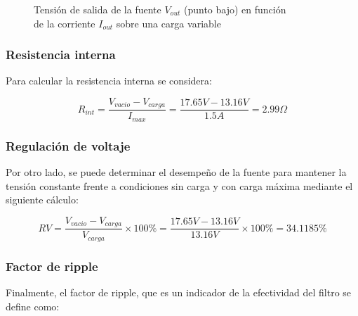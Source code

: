 \documentclass[chaptersright]{informeutn}
\begin{document}
\begin{figure}[H]
\begin{minipage}{0.35\textwidth}
        \end{minipage}%
        \caption{\footnotesize
        Tensión de salida de la fuente $V_{out}$ (punto bajo) en función \\
        de la corriente $I_{out}$ sobre una carga variable}
        \label{fig:curva_salida_bajo}
        \end{figure}

        \subsubsection{Resistencia interna}
        
        Para calcular la resistencia interna se considera:

        \begin{equation*}
            R_{int} = \frac{V_{vacio} - V_{carga}}{I_{max}}= \frac{17.65V - 13.16V}{1.5A} = 2.99\Omega
        \end{equation*}

        \subsubsection{Regulación de voltaje}

        Por otro lado, se puede determinar el desempeño de la fuente para mantener la tensión constante frente a
        condiciones sin carga y con carga máxima mediante el siguiente cálculo:

        \begin{equation*}
            RV = \frac{V_{vacio} -V_{carga}}{V_{carga}} \times 100\% = \frac{17.65V-13.16V}{13.16V} \times 100\% = 34.1185\%
        \end{equation*}

        \subsubsection{Factor de ripple}
        
        Finalmente, el factor de ripple, que es un indicador de la efectividad del filtro se define como:
\end{document}
